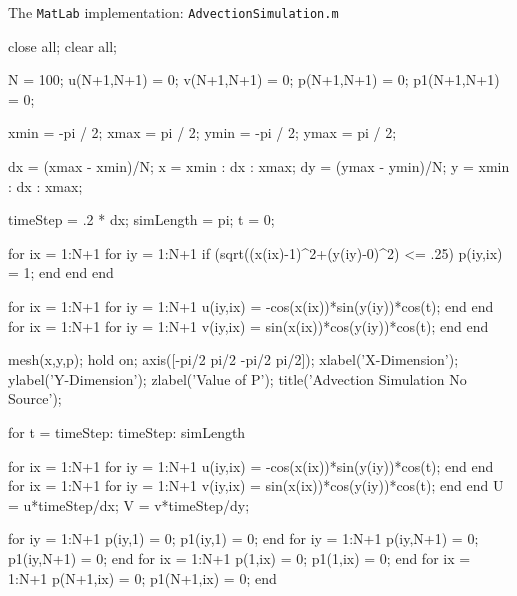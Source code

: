 \documentclass[12pt]{article}
\begin{document}
The \texttt{MatLab} implementation:\newline\newline
\texttt{AdvectionSimulation.m}
\begin{verbatimtab}
close all;
clear all;

N = 100; %
u(N+1,N+1) = 0;
v(N+1,N+1) = 0;
p(N+1,N+1) = 0;
p1(N+1,N+1) = 0;

xmin = -pi / 2;
xmax = pi / 2;
ymin = -pi / 2;
ymax = pi / 2;

dx = (xmax - xmin)/N;
x = xmin : dx : xmax;
dy = (ymax - ymin)/N;
y = xmin : dx : xmax;

timeStep = .2 * dx;
simLength = pi;
t = 0;

for ix = 1:N+1
    for iy = 1:N+1
        if (sqrt((x(ix)-1)^2+(y(iy)-0)^2) <= .25)
            p(iy,ix) = 1;
        end
    end
end

for ix = 1:N+1
    for iy = 1:N+1
        u(iy,ix) = -cos(x(ix))*sin(y(iy))*cos(t);
    end
end
for ix = 1:N+1
    for iy = 1:N+1
        v(iy,ix) = sin(x(ix))*cos(y(iy))*cos(t);
    end
end

mesh(x,y,p); hold on;
axis([-pi/2 pi/2 -pi/2 pi/2]);
xlabel('X-Dimension');
ylabel('Y-Dimension');
zlabel('Value of P');
title('Advection Simulation No Source');


for t = timeStep: timeStep: simLength
    
    for ix = 1:N+1
        for iy = 1:N+1
            u(iy,ix) = -cos(x(ix))*sin(y(iy))*cos(t);
        end
    end
    for ix = 1:N+1
        for iy = 1:N+1
            v(iy,ix) = sin(x(ix))*cos(y(iy))*cos(t);
        end
    end
    U = u*timeStep/dx; %
    V = v*timeStep/dy; %
    
    for iy = 1:N+1
        p(iy,1) = 0;
        p1(iy,1) = 0;
    end
    for iy = 1:N+1
        p(iy,N+1) = 0;
        p1(iy,N+1) = 0;
    end
    for ix = 1:N+1
        p(1,ix) = 0;
        p1(1,ix) = 0;
    end
    for ix = 1:N+1
        p(N+1,ix) = 0;
        p1(N+1,ix) = 0;
    end


\end{verbatimtab}
\end{document}

